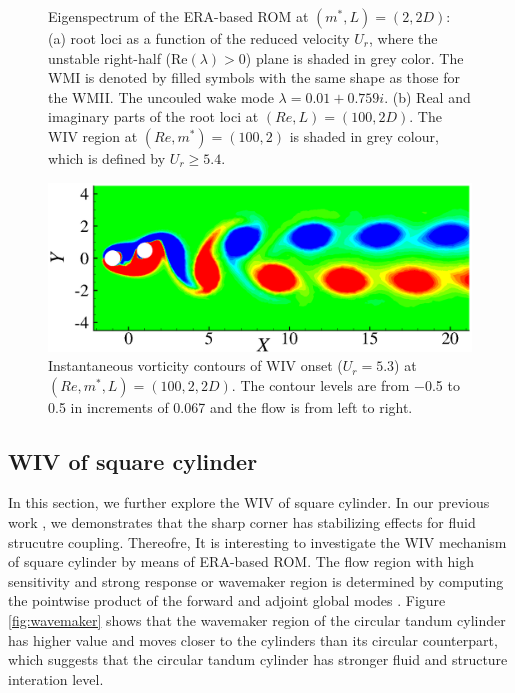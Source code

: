 \begin{figure}
\begin{subfigure}{0.495\textwidth}
    \caption{}
    \label{•}
    \end{subfigure} 
  \caption{Eigenspectrum of the ERA-based ROM at $(m^*,L)=(2,2D)$: 
     (a) root loci as a function of the reduced velocity $U_r$, 
     where the unstable right-half (Re$(\lambda) > 0$) plane is shaded in grey color.
     The WMI is denoted by filled symbols with the same shape as those for the WMII. 
     The uncouled wake mode $\lambda=0.01+0.759i$.
     (b) Real and imaginary parts of the root loci at $(Re,L)=(100,2D)$.
     The WIV region at $(Re,m^*)=(100,2)$ is shaded in grey colour, which is defined by 
     $ U_{r} \ge 5.4$.}
\label{fig:ld2_eig_re100}  
\end{figure}

\begin{figure}
	 \centering
	 \includegraphics[scale=0.45]{circle_re100_m2_onset_vor}
     \caption{Instantaneous vorticity contours of WIV onset ($U_r=5.3$)
      at $(Re,m^*,L)=(100,2,2D)$.
      The contour levels are from −0.5 to 0.5 in increments of 0.067 and the flow is from left to
      right. }
\label{fig:fom_20_onset_vor}
\end{figure}

\subsection{WIV of square cylinder}\label{sec:WIV_square}

In this section, we further explore the WIV of square cylinder. In our previous work \cite{yao_jfm_1}, 
we demonstrates that the sharp corner has stabilizing effects for fluid strucutre coupling. Thereofre, 
It is interesting to investigate the WIV mechanism of square cylinder by means of ERA-based ROM.
The flow region with high sensitivity and strong response or wavemaker region is determined by computing the pointwise 
product of the forward and adjoint global modes \cite{Luchini2007}. 
Figure \ref{fig:wavemaker} shows that the wavemaker region of the circular tandum cylinder has higher value and 
moves closer to the cylinders than its circular counterpart, which suggests that the circular tandum cylinder 
has stronger fluid and structure interation level. 


